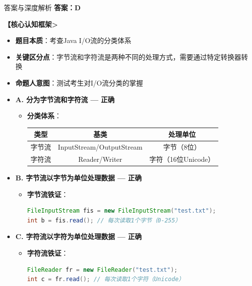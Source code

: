 \documentclass[12pt, a4paper]{ctexart}
\begin{document}
\begin{bluebox}{答案与深度解析}
	\textbf{答案：D}

	\textbf{【核心认知框架>}
	\begin{itemize}[label={}, leftmargin=*, nosep]
		\item \textbf{题目本质}：考查Java I/O流的分类体系
		\item \textbf{关键区分点}：字节流和字符流是两种不同的处理方式，需要通过特定转换器转换
		\item \textbf{命题人意图}：测试考生对I/O流分类的掌握
	\end{itemize}

	\begin{itemize}[label={}, nosep]
		\item \textbf{A. 分为字节流和字符流 — 正确}
		\begin{itemize}[label={}, leftmargin=*, nosep]
			\item \textbf{分类体系}：
			      \begin{center}
				      \begin{tabular}{|c|c|c|}
					      \hline
					      \textbf{类型} & \textbf{基类}              & \textbf{处理单位}  \\
					      \hline
					      字节流         & InputStream/OutputStream & 字节（8位）         \\
					      \hline
					      字符流         & Reader/Writer            & 字符（16位Unicode） \\
					      \hline
				      \end{tabular}
			      \end{center}
		\end{itemize}

		\item \textbf{B. 字节流以字节为单位处理数据 — 正确}
		\begin{itemize}[label={}, leftmargin=*, nosep]
			\item \textbf{字节流铁证}：
			      \begin{lstlisting}[language=Java]
FileInputStream fis = new FileInputStream("test.txt");
int b = fis.read(); // 每次读取1个字节（0-255）
      \end{lstlisting}
		\end{itemize}

		\item \textbf{C. 字符流以字符为单位处理数据 — 正确}
		\begin{itemize}[label={}, leftmargin=*, nosep]
			\item \textbf{字符流铁证}：
			      \begin{lstlisting}[language=Java]
FileReader fr = new FileReader("test.txt");
int c = fr.read(); // 每次读取1个字符（Unicode）
      \end{lstlisting}
		\end{itemize}


\end{itemize}
\end{bluebox}
\end{document}
